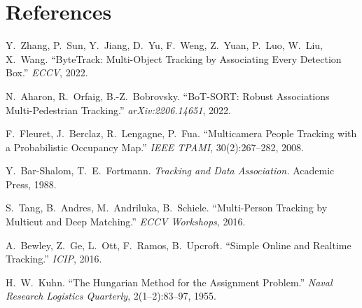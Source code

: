 \documentclass[11pt,a4paper]{article}
\begin{document}
\section{References}

\begin{enumerate}[label={[\arabic*]},leftmargin=*,itemsep=2pt]
\item Y.\ Zhang, P.\ Sun, Y.\ Jiang, D.\ Yu, F.\ Weng, Z.\ Yuan, P.\ Luo,
      W.\ Liu, X.\ Wang.
      ``ByteTrack: Multi-Object Tracking by Associating Every Detection Box.''
      \textit{ECCV}, 2022.

\item N.\ Aharon, R.\ Orfaig, B.-Z.\ Bobrovsky.
      ``BoT-SORT: Robust Associations Multi-Pedestrian Tracking.''
      \textit{arXiv:2206.14651}, 2022.

\item F.\ Fleuret, J.\ Berclaz, R.\ Lengagne, P.\ Fua.
      ``Multicamera People Tracking with a Probabilistic Occupancy Map.''
      \textit{IEEE TPAMI}, 30(2):267--282, 2008.

\item Y.\ Bar-Shalom, T.\ E.\ Fortmann.
      \textit{Tracking and Data Association.}
      Academic Press, 1988.

\item S.\ Tang, B.\ Andres, M.\ Andriluka, B.\ Schiele.
      ``Multi-Person Tracking by Multicut and Deep Matching.''
      \textit{ECCV Workshops}, 2016.

\item A.\ Bewley, Z.\ Ge, L.\ Ott, F.\ Ramos, B.\ Upcroft.
      ``Simple Online and Realtime Tracking.''
      \textit{ICIP}, 2016.

\item H.\ W.\ Kuhn.
      ``The Hungarian Method for the Assignment Problem.''
      \textit{Naval Research Logistics Quarterly}, 2(1--2):83--97, 1955.
\end{enumerate}
\end{document}
